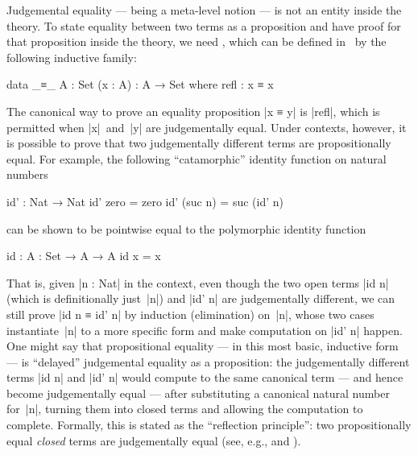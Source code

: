 Judgemental equality --- being a meta-level notion --- is not an entity inside the theory.
To state equality between two terms as a proposition and have proof for that proposition inside the theory, we need , which can be defined in \Agda\ by the following inductive family:
\begin{code}
data _≡_ {A : Set} (x : A) : A → Set where
  refl : x ≡ x
\end{code}
The canonical way to prove an equality proposition |x ≡ y| is |refl|, which is permitted when |x|~and~|y| are judgementally equal.
Under contexts, however, it is possible to prove that two judgementally different terms are propositionally equal.
For example, the following ``catamorphic'' identity function on natural numbers
\begin{code}
id' : Nat → Nat
id' zero     = zero
id' (suc n)  = suc (id' n)
\end{code}
can be shown to be pointwise equal to the polymorphic identity function
\begin{code}
id : {A : Set} → A → A
id x = x
\end{code}
That is, given |n : Nat| in the context, even though the two open terms |id n| (which is definitionally just~|n|) and |id' n| are judgementally different, we can still prove |id n ≡ id' n| by induction (elimination) on~|n|, whose two cases instantiate~|n| to a more specific form and make computation on |id' n| happen.
One might say that propositional equality --- in this most basic, inductive form --- is ``delayed'' judgemental equality as a proposition:
the judgementally different terms |id n| and |id' n| would compute to the same canonical term --- and hence become judgementally equal --- after substituting a canonical natural number for~|n|, turning them into closed terms and allowing the computation to complete.
Formally, this is stated as the ``reflection principle'': two propositionally equal \emph{closed} terms are judgementally equal (see, e.g., \citet[Section~5.1.3]{Luo-type-theory} and \citet[Section~1.1]{Streicher-ITT}).

